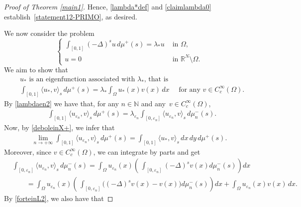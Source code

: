\documentclass[12pt,a4paper,intlimits,sumlimits]{amsart}
\def \N {\mathbb{N}}
\def \R {\mathbb{R}}
\theoremstyle{definition}
\theoremstyle{plain}
\numberwithin{equation}{section}
\begin{document}
\begin{proof}[Proof of Theorem \ref{main1}]
Hence, \eqref{lambda*def} and \eqref{claimlambda0} establish~\eqref{statement12-PRIMO}, as desired.

We now consider the problem
\[
\begin{cases}
\displaystyle\int_{[0, 1]} (-\Delta)^s u\, d\mu^+(s) = \lambda_* u &  \mbox{ in } \Omega,\\
u=0 &\mbox{ in } \R^N \setminus \Omega.
\end{cases}
\]
We aim to show that
\begin{equation}\label{u*autofunzione}\begin{split}
&{\mbox{$u_*$ is an eigenfunction associated with $\lambda_*$, that is}}\\&
\int_{[0,1]}\langle u_*,v\rangle_s\,d\mu^+(s)
=\lambda_* \int_\Omega u_*(x) v(x)\,dx
\quad\mbox{ for any } v\in C^\infty_c(\Omega).\end{split}
\end{equation}
By \eqref{lambdaen2} we have that, for any $n\in \N$
and any~$v\in C^\infty_c(\Omega)$,
\begin{equation}\label{zserfvbhjikop}
\begin{aligned}
&\int_{[0,1]} 
\langle u_{\varepsilon_n},v\rangle_s
\,d\mu^+(s) =\lambda_{\varepsilon_n}  \int_{[0, \varepsilon_n]}
\langle u_{\varepsilon_n},v\rangle_s
\,d\mu^-_n(s) .
\end{aligned}
\end{equation}
Now, by \eqref{deboleinX+}, we infer that
\begin{equation}\label{zserfvbhjikop1}
\begin{aligned}
\lim_{n\to +\infty}\int_{[0,1]}
\langle u_{\varepsilon_n},v\rangle_s
\,d\mu^+(s)
=\int_{[0,1]}\langle u_*,v\rangle_s\,dx\,dy\,d\mu^+(s).
\end{aligned}
\end{equation}
Moreover, since $v\in C^\infty_c(\Omega)$, we can integrate by parts and get
\begin{equation}\label{zserfvbhjikop2}
\begin{aligned}&
\int_{[0, \varepsilon_n]}\langle u_{\varepsilon_n},v\rangle_s\,d\mu^-_n(s)
=\int_\Omega u_{\varepsilon_n}(x)\left(\,\int_{[0, \varepsilon_n]}(-\Delta)^s v(x) d\mu^-_n(s)\right)dx \\
&\qquad=\int_\Omega u_{\varepsilon_n}(x)\left(\,\int_{[0, \varepsilon_n]}\Big((-\Delta)^s v(x)-v(x)\Big) d\mu^-_n(s)\right)dx +\int_{\Omega}u_{\varepsilon_n}(x)v(x)\,dx.
\end{aligned}
\end{equation}
By \eqref{forteinL2}, we also have that

\end{proof}
\end{document}
